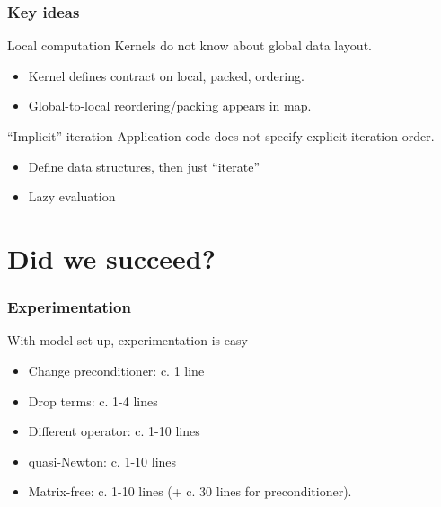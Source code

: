 \documentclass[presentation]{beamer}
\begin{document}
\begin{frame}
  \frametitle{Key ideas}
  \begin{block}{Local computation}
    Kernels do not know about global data layout.
    \begin{itemize}
    \item Kernel defines contract on local, packed, ordering.
    \item Global-to-local reordering/packing appears in map.
    \end{itemize}
  \end{block}
  \begin{block}{``Implicit'' iteration}
    Application code does not specify explicit iteration order.
    \begin{itemize}
    \item Define data structures, then just ``iterate''
    \item Lazy evaluation
    \end{itemize}
  \end{block}
\end{frame}

\section{Did we succeed?}

\begin{frame}
  \frametitle{Experimentation}
  
  With model set up, experimentation is easy

  \begin{itemize}
  \item Change preconditioner: c. 1 line
  \item Drop terms: c. 1-4 lines
  \item Different operator: c. 1-10 lines
  \item quasi-Newton: c. 1-10 lines
  \item Matrix-free: c. 1-10 lines (+ c. 30 lines for preconditioner).
  \end{itemize}
\end{frame}
\end{document}

